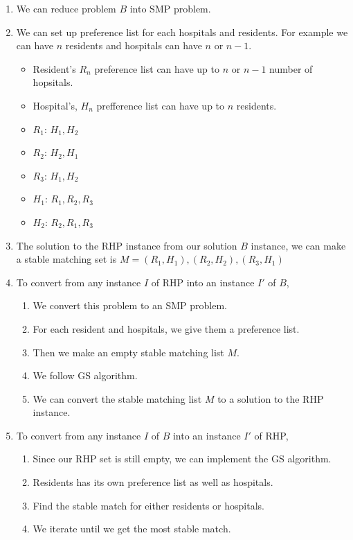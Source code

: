 \documentclass[12pt]{article}
\begin{document}
\begin{enumerate}
    \item We can reduce problem $B$ into SMP problem.
    \item We can set up preference list for each hospitals and residents. For example we can have $n$ residents
    and hospitals can have $n$ or $n - 1$.
        \begin{itemize}
            \item Resident's $R_n$ preference list can have up to $n$ or $n-1$ number of hopsitals.
            \item Hospital's, $H_n$ prefference list can have up to $n$ residents.
            \item $R_1$: $H_1, H_2$
            \item $R_2$: $H_2, H_1$
            \item $R_3$: $H_1, H_2$
            \item $H_1$: $R_1, R_2, R_3$
            \item $H_2$: $R_2, R_1, R_3$
        \end{itemize}
    \item The solution to the RHP instance from our solution $B$ instance, we can make a 
     stable matching set is $M = (R_1, H_1), (R_2, H_2), (R_3, H_1)$
    \item To convert from any instance $I$ of RHP into an instance $I'$ of $B$,
    \begin{enumerate}
        \item We convert this problem to an SMP problem.
        \item For each resident and hospitals, we give them a preference list.
        \item Then we make an empty stable matching list $M$.
        \item We follow GS algorithm.
        \item We can convert the stable matching list $M$ to a solution to the RHP instance.
    \end{enumerate}
    \item To convert from any instance $I$ of $B$ into an instance $I'$ of RHP,
    \begin{enumerate}
        \item Since our RHP set is still empty, we can implement the GS algorithm.
        \item Residents has its own preference list as well as hospitals.
        \item Find the stable match for either residents or hospitals.
        \item We iterate until we get the most stable match.
    \end{enumerate}
\end{enumerate}
\end{document}
